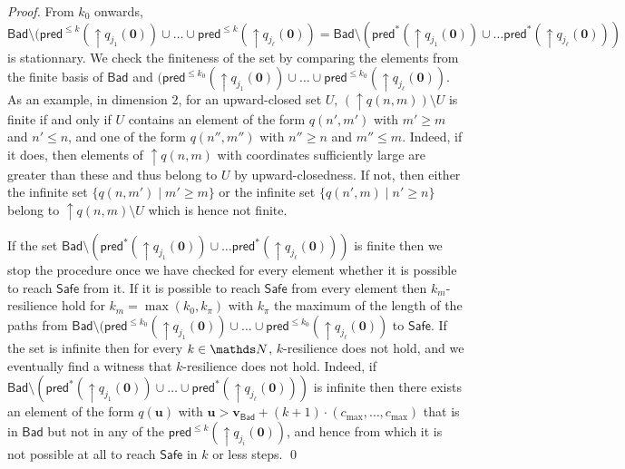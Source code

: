 \documentclass[runningheads]{llncs}
\newcommand{\mathieu}[1]{\todo[inline,color=blue!20]{{\bf MH:} #1}}
\newcommand{\pred}{\textsf{pred}}
\newcommand{\Bad}{\textsf{Bad}}
\newcommand{\Safe}{\textsf{Safe}}
\begin{document}
\begin{proof}
From $k_0$ onwards,
$\Bad \setminus (\pred^{\leq k}(\mathop{\uparrow} q_{j_1}(\textbf{0}))\cup \ldots \cup \pred^{\leq k}(\mathop{\uparrow} q_{j_\ell}(\textbf{0}))= 
\Bad \setminus (\pred^{*}(\mathop{\uparrow} q_{j_1}(\textbf{0})) \cup \ldots \pred^{*}(\mathop{\uparrow} q_{j_\ell}(\textbf{0})) )$
is stationnary. 
We check the finiteness of the set by comparing the elements from the finite basis of $\Bad$ and
$(\pred^{\leq k_0}(\mathop{\uparrow} q_{j_1}(\textbf{0}))\cup \ldots \cup \pred^{\leq k_0}(\mathop{\uparrow} q_{j_\ell}(\textbf{0}))$.
%
As an example, in dimension $2$, for an upward-closed set $U$, $(\mathop{\uparrow} q(n,m)) \setminus U$ is finite if and only if $U$ contains an element of the form $q(n',m')$ with $m' \geq m$ and $n' \leq n$,
and one of the form $q(n'',m'')$ with $n'' \geq n$ and $m'' \leq m$. Indeed, if it does, then
elements of $\mathop{\uparrow} q(n,m)$ with coordinates sufficiently large are greater than these and thus belong to $U$ by upward-closedness.
If not, then either the infinite set $\{q(n,m') \mid m' \geq m \}$ or the infinite set
$\{q(n',m) \mid n' \geq n \}$   belong to $\mathop{\uparrow} q(n,m) \setminus U$ which is hence not finite.

If the set $\Bad \setminus (\pred^{*}(\mathop{\uparrow} q_{j_1}(\textbf{0})) \cup \ldots \pred^{*}(\mathop{\uparrow} q_{j_\ell}(\textbf{0})) )$ is finite then we stop the procedure once we have checked for every element
whether it is possible to reach $\Safe$ from it.
If it is possible to reach $\Safe$ from every element then {\sc $k_m$-resilience}
hold
for $k_m = \max(k_0, k_{\pi})$ with 
$k_{\pi}$ the maximum of the length of the paths from 
$\Bad \setminus (\pred^{\leq k_0}(\mathop{\uparrow} q_{j_1}(\textbf{0}))\cup \ldots \cup \pred^{\leq k_0}(\mathop{\uparrow} q_{j_\ell}(\textbf{0}))$ to $\Safe$.
If the set is infinite then
for every $k \in \N$,
$k$-resilience does not hold, 
and we eventually find a witness that $k$-resilience does not hold.
Indeed, 
if
$\Bad \setminus (\pred^{*}(\mathop{\uparrow} q_{j_1}(\textbf{0})) \cup \ldots \cup \pred^{*}(\mathop{\uparrow} q_{j_\ell}(\textbf{0})) )$
is
infinite
then
there exists an element of the form $q(\textbf{u} )$
with $\textbf{u} > \textbf{v}_{\Bad} + (k+1) \cdot (c_{\max}, \ldots, c_{\max})$ 
that is in $\Bad$ but not in any of the $\pred^{\leq k}(\mathop{\uparrow} q_{j_i}(\textbf{0}))$,
and hence from which it is not possible at all to reach
$\Safe$ in $k$ or less steps.
\qed
\end{proof}
\end{document}
